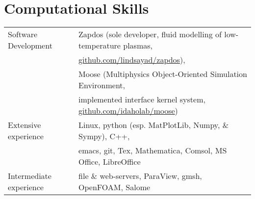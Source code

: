 \documentclass[a4paper,10pt]{article} %
\newcounter{magicrownumbers}
\begin{document}


\pagebreak


\setcounter{magicrownumbers}{0}



\FloatBarrier


\section{Computational Skills}

\begin{tabular}{ll}

Software Development & Zapdos (sole developer, fluid modelling of low-temperature plasmas,\\
& \url{github.com/lindsayad/zapdos}),\\
& Moose (Multiphysics Object-Oriented Simulation Environment,\\
& implemented interface kernel system, \url{github.com/idaholab/moose})\\

Extensive experience & Linux, python (esp. MatPlotLib, Numpy, \& Sympy), C++,\\
& emacs, git, Tex, Mathematica, Comsol, MS Office, LibreOffice \\

Intermediate experience & file \& web-servers, ParaView, gmsh, OpenFOAM, Salome\\

\end{tabular}

\end{document}
